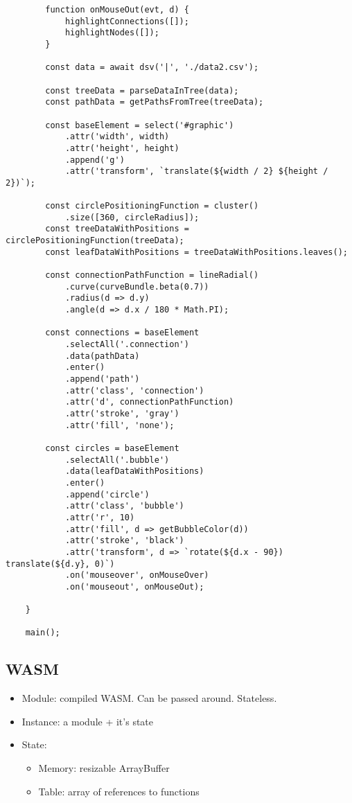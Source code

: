 \begin{lstlisting}
        function onMouseOut(evt, d) {
            highlightConnections([]);
            highlightNodes([]);
        }
    
        const data = await dsv('|', './data2.csv');
    
        const treeData = parseDataInTree(data);
        const pathData = getPathsFromTree(treeData);
    
        const baseElement = select('#graphic')
            .attr('width', width)
            .attr('height', height)
            .append('g')
            .attr('transform', `translate(${width / 2} ${height / 2})`);
    
        const circlePositioningFunction = cluster()
            .size([360, circleRadius]);
        const treeDataWithPositions = circlePositioningFunction(treeData);
        const leafDataWithPositions = treeDataWithPositions.leaves();
    
        const connectionPathFunction = lineRadial()
            .curve(curveBundle.beta(0.7))
            .radius(d => d.y)
            .angle(d => d.x / 180 * Math.PI);
    
        const connections = baseElement
            .selectAll('.connection')
            .data(pathData)
            .enter()
            .append('path')
            .attr('class', 'connection')
            .attr('d', connectionPathFunction)
            .attr('stroke', 'gray')
            .attr('fill', 'none');
    
        const circles = baseElement
            .selectAll('.bubble')
            .data(leafDataWithPositions)
            .enter()
            .append('circle')
            .attr('class', 'bubble')
            .attr('r', 10)
            .attr('fill', d => getBubbleColor(d))
            .attr('stroke', 'black')
            .attr('transform', d => `rotate(${d.x - 90}) translate(${d.y}, 0)`)
            .on('mouseover', onMouseOver)
            .on('mouseout', onMouseOut);
    
    }
    
    main();
\end{lstlisting}


\subsection{WASM}

\begin{itemize}
    \item Module: compiled WASM. Can be passed around. Stateless.
    \item Instance: a module + it's state
    \item State: 
        \begin{itemize}
            \item Memory: resizable ArrayBuffer
            \item Table: array of references to functions
        \end{itemize}
\end{itemize}

